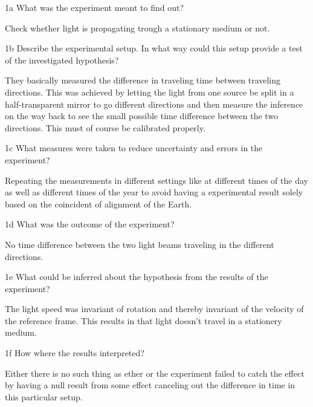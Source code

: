 \documentclass[a4paper,twoside=false,abstract=false,numbers=noenddot,
titlepage=false,headings=small,parskip=half,version=last]{scrartcl}
\begin{document}

\begin{exercise}{1a}
    What was the experiment meant to find out?
\end{exercise}
\begin{solution}
    Check whether light is propagating trough a stationary medium or not.
\end{solution}
\begin{exercise}{1b}
    Describe the experimental setup. In what way could this setup provide a
    test of the investigated hypothesis?
\end{exercise}
\begin{solution}
    They basically measured the difference in traveling time between 
    traveling directions. This was achieved by letting the light from one
    source be split in a half-transparent mirror to go different directions and
    then measure the inference on the way back to see the small possible time
    difference between the two directions. This must of course be calibrated
    properly.
\end{solution}
\begin{exercise}{1c}
    What measures were taken to reduce uncertainty and errors in the
    experiment?
\end{exercise}
\begin{solution}
    Repeating the measurements in different settings like at different times of
    the day as well as different times of the year to avoid having a
    experimental result solely based on the coincident of alignment of the Earth.
\end{solution}
\begin{exercise}{1d} 
    What was the outcome of the experiment?
\end{exercise}
\begin{solution}
    No time difference between the two light beams traveling in the different
    directions.
\end{solution}
\begin{exercise}{1e}
    What could be inferred about the hypothesis from the results of the
    experiment?
\end{exercise}
\begin{solution}
    The light speed was invariant of rotation and thereby invariant of the
    velocity of the reference frame. This results in that light doesn't travel
    in a stationery medium.
\end{solution}
\begin{exercise}{1f} 
    How where the results interpreted?
\end{exercise}
\begin{solution}
    Either there is no such thing as ether or the experiment failed to catch
    the effect by having a null result from some effect canceling out the
    difference in time in this particular setup.
\end{solution}
\end{document}
